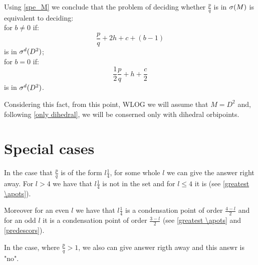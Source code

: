 Using \ref{spe_M} 
we conclude that the problem of deciding whether $\frac{p}{q}$ is in ${\sigma}(M)$
is equivalent to deciding: \\
for $b \neq 0$ if:
\begin{equation}
\frac{p}{q} + 2h + c + (b-1) 
\end{equation} 
is in ${\sigma^d(D^2)}$; \\
for $b = 0$ if:
\begin{equation}
\frac{1}{2}\frac{p}{q}+h+\frac{c}{2}
\end{equation}
is in ${\sigma^d(D^2)}$.

Considering this fact, from this point, WLOG we will assume that $M = D^2$ and, 
following \ref{only dihedral}, we will 
be conserned only with dihedral orbipoints.


\section{Special cases}
In the case that $\frac{p}{q}$ is of the form $l\frac{1}{4}$, for some whole $l$ 
we can give the answer right away. For $l > 4$ we have that $l\frac{1}{4}$ is not in the set 
and for $l \leq 4$ it is (see \ref{greatest \apots}). 

Moreover for an even $l$ we have that $l\frac{1}{4}$ is a condensation point of order 
$\frac{4-l}{2}$ 
and for an odd $l$ it is a condensation point of order $\frac{3-l}{2}$ (see \ref{greatest \apots} 
and \ref{predescors}). 

In the case, where $\frac{p}{q} > 1$, we also can give answer rigth away and this answr is "no". 

